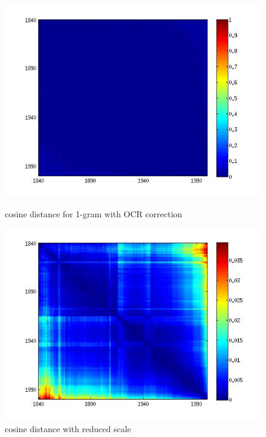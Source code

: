 \begin{figure}[H]
    \begin{minipage}[b]{0.48\linewidth}
        \includegraphics[scale=0.3]{Pictures/cos/cos_corrected2.jpg}
        \caption{cosine distance for 1-gram with OCR correction}
        \label{cos_1}
    \end{minipage}\hfill
    \begin{minipage}[b]{0.5\linewidth}
        \includegraphics[scale=0.3]{Pictures/cos/cos_corrected.jpg}
        \caption{cosine distance with reduced scale}
        \label{cos_2}
    \end{minipage}\hfill
\end{figure}
